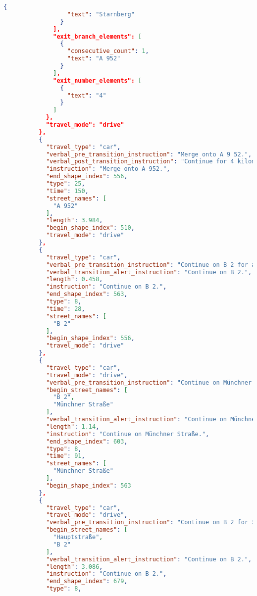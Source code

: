 \begin{lstlisting}[language=json,breaklines=true]
                {
                  "text": "Starnberg"
                }
              ],
              "exit_branch_elements": [
                {
                  "consecutive_count": 1,
                  "text": "A 952"
                }
              ],
              "exit_number_elements": [
                {
                  "text": "4"
                }
              ]
            },
            "travel_mode": "drive"
          },
          {
            "travel_type": "car",
            "verbal_pre_transition_instruction": "Merge onto A 9 52.",
            "verbal_post_transition_instruction": "Continue for 4 kilometers.",
            "instruction": "Merge onto A 952.",
            "end_shape_index": 556,
            "type": 25,
            "time": 150,
            "street_names": [
              "A 952"
            ],
            "length": 3.984,
            "begin_shape_index": 510,
            "travel_mode": "drive"
          },
          {
            "travel_type": "car",
            "verbal_pre_transition_instruction": "Continue on B 2 for a half kilometer.",
            "verbal_transition_alert_instruction": "Continue on B 2.",
            "length": 0.458,
            "instruction": "Continue on B 2.",
            "end_shape_index": 563,
            "type": 8,
            "time": 28,
            "street_names": [
              "B 2"
            ],
            "begin_shape_index": 556,
            "travel_mode": "drive"
          },
          {
            "travel_type": "car",
            "travel_mode": "drive",
            "verbal_pre_transition_instruction": "Continue on Münchner Straße for 1.1 kilometers.",
            "begin_street_names": [
              "B 2",
              "Münchner Straße"
            ],
            "verbal_transition_alert_instruction": "Continue on Münchner Straße.",
            "length": 1.14,
            "instruction": "Continue on Münchner Straße.",
            "end_shape_index": 603,
            "type": 8,
            "time": 91,
            "street_names": [
              "Münchner Straße"
            ],
            "begin_shape_index": 563
          },
          {
            "travel_type": "car",
            "travel_mode": "drive",
            "verbal_pre_transition_instruction": "Continue on B 2 for 3.1 kilometers.",
            "begin_street_names": [
              "Hauptstraße",
              "B 2"
            ],
            "verbal_transition_alert_instruction": "Continue on B 2.",
            "length": 3.086,
            "instruction": "Continue on B 2.",
            "end_shape_index": 679,
            "type": 8,

\end{lstlisting}
